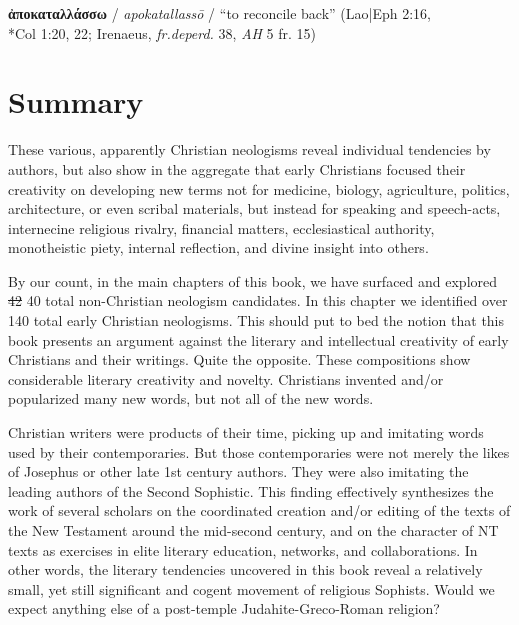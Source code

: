 \noindent{}\textbf{ἀποκαταλλάσσω} / \textit{apokatallassō} / “to reconcile back” %
(Lao|Eph 2:16, \\\makebox[3em][l]{} *Col 1:20, 22; Irenaeus, \textit{fr.deperd.} 38, \textit{AH} 5 fr. 15) \\[1mm] %

\section{Summary}

\noindent{}These various, apparently Christian neologisms reveal individual tendencies by authors, %
but also show in the aggregate that early Christians focused their creativity %
on developing new terms not for medicine, biology, agriculture, politics, architecture, or even scribal materials,  %
but instead for speaking and speech-acts, %
internecine religious rivalry, %
financial matters, %
ecclesiastical authority, %
monotheistic piety, internal reflection, and divine insight into others. %

By our count, in the main chapters of this book, %
we have surfaced and explored \st{42} 40 total non-Christian neologism candidates. %
In this chapter we identified over 140 total early Christian neologisms. %
This should put to bed the notion that this book presents an argument against the literary and intellectual %
creativity of early Christians and their writings. Quite the opposite. %
These compositions show considerable literary creativity and novelty. %
Christians invented and/or popularized many new words, but not all of the new words. %

Christian writers were products of their time, picking up and imitating words used by their contemporaries. %
But those contemporaries were not merely the likes of Josephus or other late 1st century authors. %
They were also imitating the leading authors of the Second Sophistic. %
This finding effectively synthesizes the work of several scholars on the coordinated creation and/or editing of the texts of the New Testament %
around the mid-second century, and on the character of NT texts as exercises in elite literary education, networks, %
and collaborations. %
In other words, the literary tendencies uncovered in this book reveal a relatively small, yet still significant %
and cogent movement of religious Sophists. %
Would we expect anything else of a post-temple Judahite-Greco-Roman religion? %

